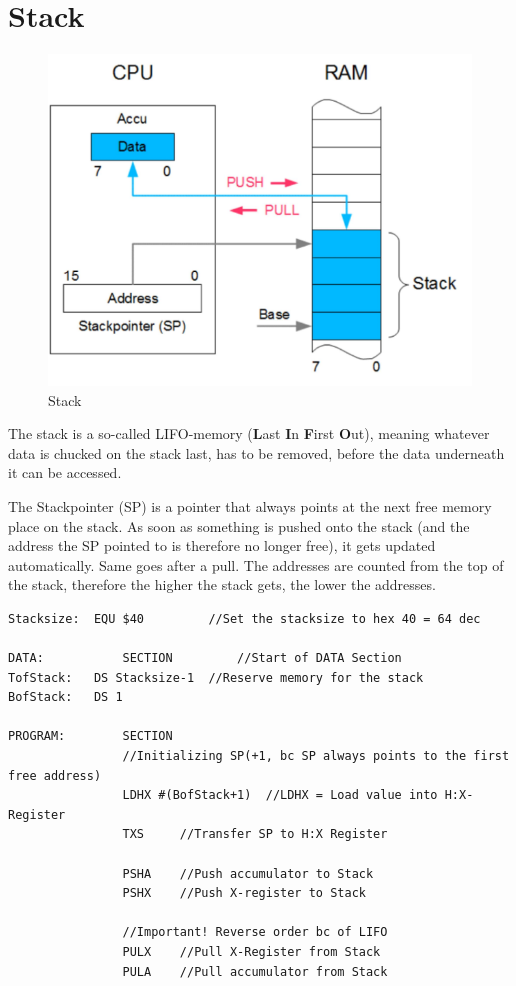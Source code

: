 \documentclass[a4paper, 11pt, nofootinbib]{article}
\begin{document}
\section{Stack}
\begin{figure}
	\centering
	\includegraphics[keepaspectratio=true,height=18\baselineskip]{stack.PNG}
	\caption{Stack}
	\label{fig:stack}
\end{figure}

The stack is a so-called LIFO-memory (\textbf{L}ast \textbf{I}n \textbf{F}irst \textbf{O}ut), meaning whatever data is chucked on the stack last, has to be removed, before the data underneath it can be accessed.
\vspace{10px}

\noindent The Stackpointer (SP) is a pointer that always points at the next free memory place on the stack. As soon as something is pushed onto the stack (and the address the SP pointed to is therefore no longer free), it gets updated automatically. Same goes after a pull. The addresses are counted from the top of the stack, therefore the higher the stack gets, the lower the addresses.

\newpage

\begin{lstlisting}[caption={Initialization of a stack}]
Stacksize:	EQU $40			//Set the stacksize to hex 40 = 64 dec

DATA:			SECTION			//Start of DATA Section	
TofStack:	DS Stacksize-1	//Reserve memory for the stack
BofStack:	DS 1

PROGRAM:		SECTION
				//Initializing SP(+1, bc SP always points to the first free address)
				LDHX #(BofStack+1)	//LDHX = Load value into H:X-Register
				TXS		//Transfer SP to H:X Register
			
				PSHA	//Push accumulator to Stack
				PSHX	//Push X-register to Stack
				
				//Important! Reverse order bc of LIFO
				PULX	//Pull X-Register from Stack
				PULA	//Pull accumulator from Stack
\end{lstlisting}
\end{document}
